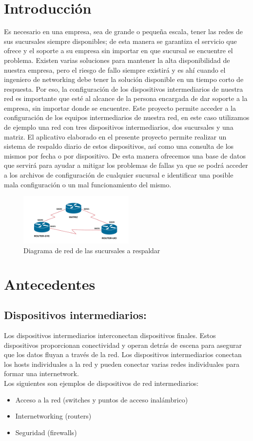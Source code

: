 \documentclass[conference]{IEEEtran}
\begin{document}
\section{Introducción}\label{sec:int}
Es necesario en una empresa, sea de grande o pequeña escala, tener las redes de sus sucursales siempre disponibles; de esta manera se garantiza el servicio que ofrece y el soporte a su empresa sin importar en que sucursal se encuentre el problema. Existen varias soluciones para mantener la alta disponibilidad de nuestra empresa, pero el riesgo de fallo siempre existirá y es ahí cuando el ingeniero de networking debe tener la solución disponible en un tiempo corto de respuesta. Por eso, la configuración de los dispositivos intermediarios de nuestra red es importante que esté al alcance de la persona encargada de dar soporte a la empresa, sin importar donde se encuentre. Este proyecto permite acceder a la configuración de los equipos intermediarios de nuestra red, en este caso utilizamos de ejemplo una red con tres dispositivos intermediarios, dos sucursales y una matriz. El aplicativo elaborado en el presente proyecto permite realizar un sistema de respaldo diario de estos dispositivos, así como una consulta de los mismos por fecha o por dispositivo. De esta manera ofrecemos una base de datos que servirá para ayudar a mitigar los problemas de fallas ya que se podrá acceder a los archivos de configuración de cualquier sucursal e identificar una posible mala configuración o un mal funcionamiento del mismo.
\begin{figure}[h]
	\centerline{\includegraphics[width=0.51\textwidth]{img/int01.png}}
	\caption{Diagrama de red de las sucursales a respaldar}
	\label{fig:ant00}
\end{figure}
\section{Antecedentes}\label{sec:ant}
\subsection{\textbf{ Dispositivos intermediarios:}}
Los dispositivos intermediarios interconectan dispositivos finales. Estos dispositivos proporcionan conectividad y operan detrás de escena para asegurar que los datos fluyan a través de la red. Los dispositivos intermediarios conectan los hosts individuales a la red y pueden conectar varias redes individuales para formar una internetwork.\\
Los siguientes son ejemplos de dispositivos de red intermediarios:
\begin{itemize}
\item Acceso a la red (switches y puntos de acceso inalámbrico)
\item Internetworking (routers)
\item Seguridad (firewalls)
\end{itemize}
\end{document}
